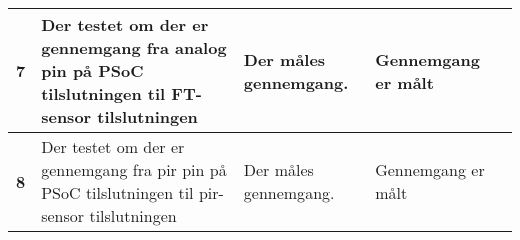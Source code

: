 \begin{center}
\begin{longtable}{|p{}|p{}|p{}|p{}|p{}|}
\textbf{7}	&Der testet om der er gennemgang fra analog pin på PSoC tilslutningen til FT-sensor tilslutningen
			&Der måles gennemgang.
			& Gennemgang er målt
			& \\ \hline 
			
\textbf{8}	&Der testet om der er gennemgang fra pir pin på PSoC tilslutningen til pir-sensor tilslutningen
			&Der måles gennemgang.
			& Gennemgang er målt
			& \\ \hline 
			

			
		
			
			
\end{longtable}
	\label{modultest_tilslutningsprint} 
\end{center}